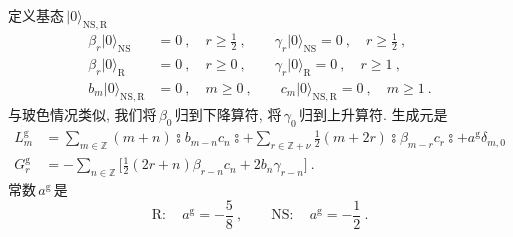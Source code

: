 定义基态$\,\lvert 0\rangle _{\mathrm{NS,R}}\,$
\begin{subequations}
\begin{align}
    \beta_{r}\lvert 0\rangle_{\mathrm{NS}} &= 0\:, \quad r\geq \tfrac{1}{2}\:, \qquad
    \gamma_{r}\lvert 0\rangle_{\mathrm{NS}}=0 \:,\quad r\geq \tfrac{1}{2}\:, \label{10.4.3a} \\
    \beta_{r}\lvert 0\rangle_{\mathrm{R}} &=0 \:, \quad r\geq 0\:, \qquad
    \gamma_{r}\lvert 0\rangle _{\mathrm{R}} =0 \:, \quad r\geq 1\:, \label{10.4.3b} \\
    b_{m}\lvert 0\rangle_{\mathrm{NS,R}}&=0 \:,\quad m\geq 0\:, \qquad 
    c_{m}\lvert 0\rangle_{\mathrm{NS,R}}=0 \:,\quad m\geq 1 \:. \label{10.4.3c}
\end{align} \label{10.4.3}
\end{subequations}
与玻色情况类似, 我们将$\,\beta_{0}\,$归到下降算符, 将$\,\gamma_{0}\,$归到上升算符. 生成元是
\begin{subequations}
\begin{align}
    L_{m}^{\mathrm{g}}&=\sum_{m\in\mathds{Z}}(m+n)\typecolon\! b_{m-n}c_{n}\!\typecolon
    +\sum_{r\in\mathds{Z}+\nu} \frac{1}{2}(m+2r)\typecolon\! \beta_{m-r}c_{r}\!\typecolon + a^{\mathrm{g}}\delta_{m,0}\label{10.4.4a} \\
    G_{r}^{\mathrm{g}}&=-\sum_{n\in\mathds{Z}} 
    \biggl[\frac{1}{2}(2r+n)\beta_{r-n}c_{n}+2b_{n}\gamma_{r-n} \biggr] \:. \label{10.4.4b}
\end{align}
\end{subequations}
常数$\,a^{\mathrm{g}}\,$是
\begin{equation}
    \mathrm{R}:\quad a^{\mathrm{g}}= -\frac{5}{8} \:, \qquad
    \mathrm{NS}:\quad a^{\mathrm{g}}= -\frac{1}{2} \:. \label{10.4.5} 
\end{equation}

